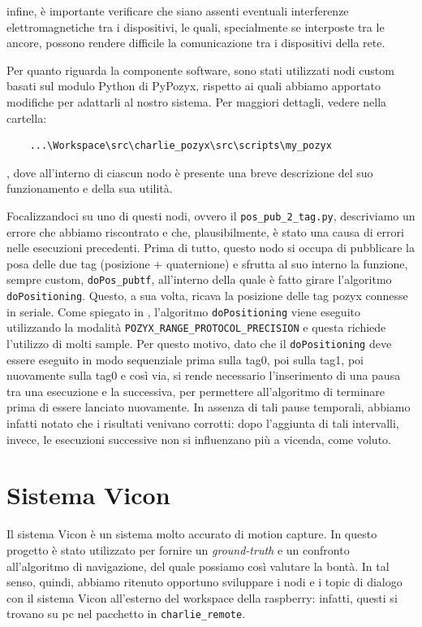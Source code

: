 infine, è importante verificare che siano assenti eventuali interferenze elettromagnetiche tra i dispositivi, le quali, specialmente se interposte tra le ancore, possono rendere difficile la comunicazione tra i dispositivi della rete.

Per quanto riguarda la componente software, sono stati utilizzati nodi custom basati sul modulo Python di PyPozyx, rispetto ai quali abbiamo apportato modifiche per adattarli al nostro sistema. Per maggiori dettagli, vedere nella cartella:
\begin{verbatim}
	...\Workspace\src\charlie_pozyx\src\scripts\my_pozyx 
\end{verbatim}
, dove all'interno di ciascun nodo è presente una breve descrizione del suo funzionamento e della sua utilità.

Focalizzandoci su uno di questi nodi, ovvero il \verb|pos_pub_2_tag.py|, descriviamo un errore che abbiamo riscontrato e che, plausibilmente, è stato una causa di errori nelle esecuzioni precedenti. Prima di tutto, questo nodo si occupa di pubblicare la posa delle due tag (posizione + quaternione) e sfrutta al suo interno la funzione, sempre custom, \verb|doPos_pubtf|, all'interno della quale è fatto girare l'algoritmo \verb|doPositioning|. Questo, a sua volta, ricava la posizione delle tag pozyx connesse in seriale. Come spiegato in \cite{ctesconistudio}, l'algoritmo \verb|doPositioning| viene eseguito utilizzando la modalità \verb|POZYX_RANGE_PROTOCOL_PRECISION| e questa richiede l'utilizzo di molti sample. Per questo motivo, dato che il \verb|doPositioning| deve essere eseguito in modo sequenziale prima sulla tag0, poi sulla tag1, poi nuovamente sulla tag0 e così via, si rende necessario l'inserimento di una pausa tra una esecuzione e la successiva, per permettere all'algoritmo di terminare prima di essere lanciato nuovamente. In assenza di tali pause temporali, abbiamo infatti notato che i risultati venivano corrotti: dopo l'aggiunta di tali intervalli, invece, le esecuzioni successive non si influenzano più a vicenda, come voluto.


\section{Sistema Vicon}
\label{sez:Sistema Vicon}

Il sistema Vicon è un sistema molto accurato di motion capture. 
In questo progetto è stato utilizzato per fornire un \textit{ground-truth} e un confronto all'algoritmo di navigazione, del quale possiamo così valutare la bontà. 
In tal senso, quindi, abbiamo ritenuto opportuno sviluppare i nodi e i topic di dialogo con il sistema Vicon all'esterno del workspace della raspberry: infatti, questi si trovano su pc nel pacchetto in \texttt{charlie\_remote}.


